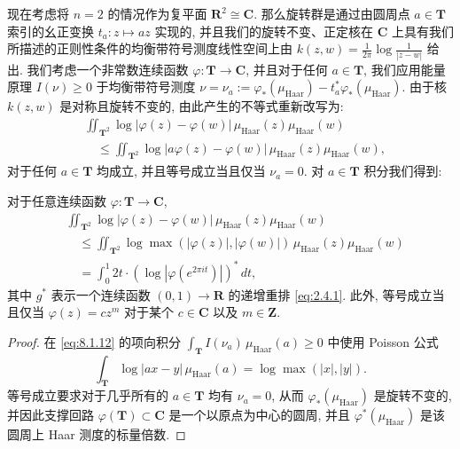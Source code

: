 现在考虑将 \(n=2\) 的情况作为复平面 \(\mathbf{R}^2 \cong \mathbf{C}\). 
那么旋转群是通过由圆周点 \(a\in \mathbf{T}\) 索引的幺正变换 \(t_a: z\mapsto az\) 实现的, 
并且我们的旋转不变、正定核在 \(\mathbf{C}\) 上具有我们所描述的正则性条件的均衡带符号测度线性空间上由 \(k(z,w)=\frac{1}{2\pi}\log\frac{1}{|z-w|}\) 给出. 
我们考虑一个非常数连续函数 \(\varphi:\mathbf{T}\to\mathbf{C}\), 
并且对于任何 \(a\in \mathbf{T}\), 我们应用能量原理 \(I(\nu)\geq 0\) 于均衡带符号测度 \(\nu=\nu_a:=\varphi_*(\mu_{\mathrm{Haar}})-t_a^*\varphi_*(\mu_{\mathrm{Haar}})\). 
由于核 \(k(z,w)\) 是对称且旋转不变的, 由此产生的不等式重新改写为:
\begin{equation}\label{eq:8.1.12}
\begin{aligned}
&\iint_{\mathbf{T}^2} \log |\varphi(z) - \varphi(w)| \, \mu_{\text{Haar}}(z) \mu_{\text{Haar}}(w) \\
&\quad \le \iint_{\mathbf{T}^2} \log |a\varphi(z) - \varphi(w)| \, \mu_{\text{Haar}}(z) \mu_{\text{Haar}}(w),
\end{aligned}
\end{equation}
对于任何 \(a \in \mathbf{T}\) 均成立, 并且等号成立当且仅当 \(\nu_a = 0\). 对 \(a \in \mathbf{T}\) 积分我们得到:

\begin{proposition}[Nazarov]\label{prop:8.1.13}
对于任意连续函数 \(\varphi : \mathbf{T} \to \mathbf{C}\),
\[
\begin{aligned}
&\iint_{\mathbf{T}^2} \log |\varphi(z) - \varphi(w)| \, \mu_{\text{Haar}}(z) \mu_{\text{Haar}}(w) \\
&\quad \leq \iint_{\mathbf{T}^2} \log \max \left( |\varphi(z)|, |\varphi(w)| \right) \, \mu_{\text{Haar}}(z) \mu_{\text{Haar}}(w) \\
&\quad = \int_0^1 2t \cdot (\log |\varphi(e^{2\pi i t})|)^* \, dt,
\end{aligned}
\]
其中 \(g^*\) 表示一个连续函数 \((0,1) \to \mathbf{R}\) 的递增重排 \eqref{eq:2.4.1}. 
此外, 等号成立当且仅当 \(\varphi(z) = cz^m\) 对于某个 \(c \in \mathbf{C}\) 以及 \(m \in \mathbf{Z}\).
\end{proposition}

\begin{proof}
在 \eqref{eq:8.1.12} 的项向积分 \(\int_{\mathbf{T}} I(\nu_a) \, \mu_{\text{Haar}}(a) \geq 0\) 中使用 Poisson 公式
\[ \int_{\mathbf{T}} \log|ax - y| \,\mu_{\text{Haar}}(a) = \log \max(|x|, |y|). \]
等号成立要求对于几乎所有的 \(a \in \mathbf{T}\) 均有 \(\nu_a = 0\), 
从而 \(\varphi_*(\mu_{\text{Haar}})\) 是旋转不变的, 
并因此支撑回路 \(\varphi(\mathbf{T}) \subset \mathbf{C}\) 是一个以原点为中心的圆周, 
并且 \(\varphi^*(\mu_{\text{Haar}})\) 是该圆周上 Haar 测度的标量倍数.
\end{proof}

